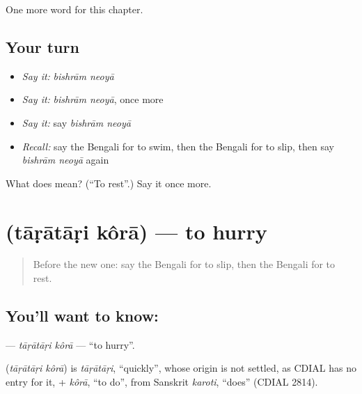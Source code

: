 \begin{grammarlens}[title={What you've built}]
One more word for this chapter.
\end{grammarlens}

\subsection*{Your turn}
\begin{itemize}
\raggedright
  \item \emph{Say it:} \emph{bishrām neoyā}
  \item \emph{Say it:} \emph{bishrām neoyā}, once more
  \item \emph{Say it:} say \emph{bishrām neoyā}
  \item \emph{Recall:} say the Bengali for to swim, then the Bengali for to slip, then say \emph{bishrām neoyā} again
\end{itemize}

\begin{tcolorbox}[breakable,colback=teal!4,colframe=teal!35!black,title={Before you move on}]
What does   mean? (\textquotedblleft{}To rest\textquotedblright{}.) Say it once more.
\end{tcolorbox}
\section[\texorpdfstring{\bn{তাড়াতাড়ি} \bn{করা} (tāṛātāṛi kôrā)}{তাড়াতাড়ি করা (tāṛātāṛi kôrā)}]{  (tāṛātāṛi kôrā) — to hurry}

\label{lesson:BN-C149-taratari-kora}



\begin{quote}
Before the new one: say the Bengali for to slip, then the Bengali for to rest.
\end{quote}

\subsection*{You'll want to know:  }
\textbf{ } — \emph{tāṛātāṛi kôrā} — \textquotedblleft{}to hurry\textquotedblright{}.

\begin{cousinweb}
\textbf{ } (\emph{tāṛātāṛi kôrā}) is \emph{tāṛātāṛi}, \textquotedblleft{}quickly\textquotedblright{}, whose origin is not settled, as CDIAL has no entry for it, + \emph{kôrā}, \textquotedblleft{}to do\textquotedblright{}, from Sanskrit \emph{karoti}, \textquotedblleft{}does\textquotedblright{} (CDIAL 2814).
\end{cousinweb}

